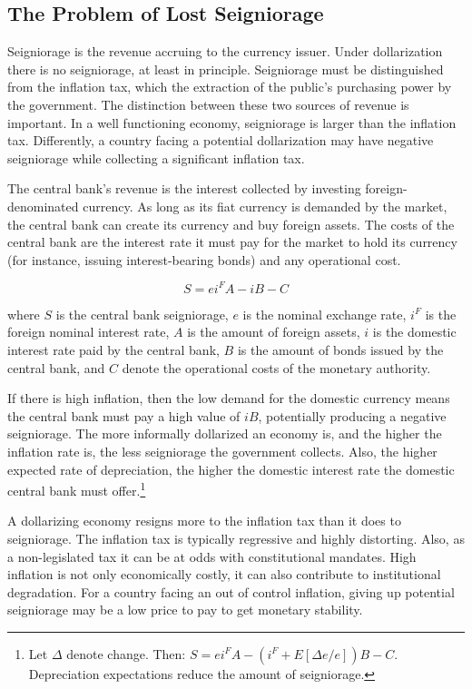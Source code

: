 \documentclass[12pt]{article}
\begin{document}
\subsection{The Problem of Lost Seigniorage}

Seigniorage is the revenue accruing to the currency issuer. Under dollarization there is no seigniorage, at least in principle. Seigniorage must be distinguished from the inflation tax, which the extraction of the public's purchasing power by the government. The distinction between these two sources of revenue is important. In a well functioning economy, seigniorage is larger than the inflation tax. Differently, a country facing a potential dollarization may have negative seigniorage while collecting a significant inflation tax.

The central bank's revenue is the interest collected by investing foreign-denominated currency. As long as its fiat currency is demanded by the market, the central bank can create its currency and buy foreign assets. The costs of the central bank are the interest rate it must pay for the market to hold its currency (for instance, issuing interest-bearing bonds) and any operational cost.

\begin{equation}\label{Eq:2}
    S = ei^FA - iB - C
\end{equation}

where $S$ is the central bank seigniorage, $e$ is the nominal exchange rate, $i^F$ is the foreign nominal interest rate, $A$ is the amount of foreign assets, $i$ is the domestic interest rate paid by the central bank, $B$ is the amount of bonds issued by the central bank, and $C$ denote the operational costs of the monetary authority.

If there is high inflation, then the low demand for the domestic currency means the central bank must pay a high value of $iB$, potentially producing a negative seigniorage. The more informally dollarized an economy is, and the higher the inflation rate is, the less seigniorage the government collects. Also, the higher expected rate of depreciation, the higher the domestic interest rate the domestic central bank must offer.\footnote{Let $\Delta$ denote change. Then: $S = ei^FA - (i^F + E[\Delta e / e])B - C$. Depreciation expectations reduce the amount of seigniorage.}

A dollarizing economy resigns more to the inflation tax than it does to seigniorage. The inflation tax is typically regressive and highly distorting. Also, as a non-legislated tax it can be at odds with constitutional mandates. High inflation is not only economically costly, it can also contribute to institutional degradation. For a country facing an out of control inflation, giving up potential seigniorage may be a low price to pay to get monetary stability.
\end{document}
